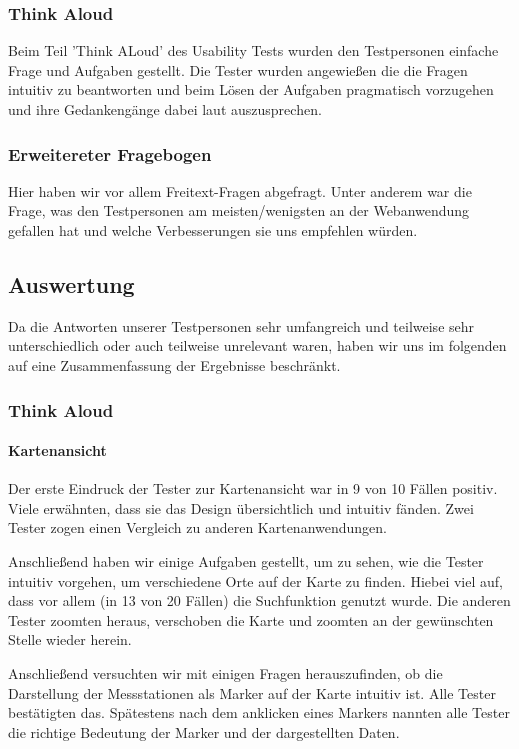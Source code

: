     \subsubsection*{Think Aloud}
      Beim Teil 'Think ALoud' des Usability Tests wurden den Testpersonen einfache Frage und Aufgaben gestellt. Die Tester wurden angewießen die die Fragen intuitiv zu beantworten und beim Lösen der Aufgaben pragmatisch vorzugehen und ihre Gedankengänge dabei laut auszusprechen.
    
    \subsubsection*{Erweitereter Fragebogen}
      Hier haben wir vor allem Freitext-Fragen abgefragt. Unter anderem war die Frage, was den Testpersonen am meisten/wenigsten an der Webanwendung gefallen hat und welche Verbesserungen sie uns empfehlen würden.

  \subsection{Auswertung}
    Da die Antworten unserer Testpersonen sehr umfangreich und teilweise sehr unterschiedlich oder auch teilweise unrelevant waren, haben wir uns im folgenden auf eine Zusammenfassung der Ergebnisse beschränkt.

    \subsubsection{Think Aloud}
      \paragraph{Kartenansicht}
        Der erste Eindruck der Tester zur Kartenansicht war in 9 von 10 Fällen positiv. Viele erwähnten, dass sie das Design übersichtlich und intuitiv fänden. Zwei Tester zogen einen Vergleich zu anderen Kartenanwendungen.

        Anschließend haben wir einige Aufgaben gestellt, um zu sehen, wie die Tester intuitiv vorgehen, um verschiedene Orte auf der Karte zu finden. Hiebei viel auf, dass vor allem (in 13 von 20 Fällen) die Suchfunktion genutzt wurde. Die anderen Tester zoomten heraus, verschoben die Karte und zoomten an der gewünschten Stelle wieder herein.

        Anschließend versuchten wir mit einigen Fragen herauszufinden, ob die Darstellung der Messstationen als Marker auf der Karte intuitiv ist. Alle Tester bestätigten das. Spätestens nach dem anklicken eines Markers nannten alle Tester die richtige Bedeutung der Marker und der dargestellten Daten.

